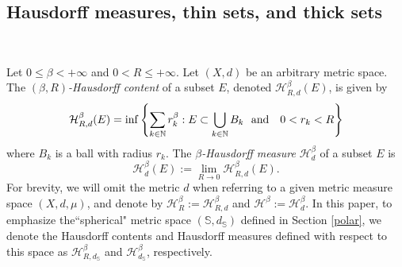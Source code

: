 \documentclass[10pt]{amsart}
\numberwithin{equation}{section}
\begin{document}
  
\subsection{Hausdorff measures, thin sets, and thick sets}
\label{sec-thin}		\ 

Let $0\le \beta<{+\infty}$ and $0<R\leq{+\infty}$. {
Let $(X,d)$ be an arbitrary metric space. The {\it $(\beta,R)$-Hausdorff content}  of a subset $E$, denoted  $\mathcal H^\beta_{R, d}(E)$, is given by
			\begin{equation}
			\notag
			\mathcal H^\beta_{R,d}(E)=\inf\left\{\sum_{k\in\mathbb N} r_k^\beta: E\subset \bigcup_{k\in\mathbb N}B_k\text{\rm \ \ and \ \ } 0<r_k<R \right\}
			\end{equation}
	where $B_k$ is a ball with radius $r_k$. The {\it $\beta$-Hausdorff measure} $\mathcal H_d^\beta$ of a subset $E$ is 
			\[
				\mathcal H_{d}^{\beta}(E):=\lim_{R\to 0}\mathcal H^\beta_{R,d}(E).
			\]
For brevity, we will omit the metric $d$ when referring to  a given metric measure space $(X,d,\mu)$, and  denote by $\mathcal H^\beta_R:=\mathcal H^\beta_{R,d}$ and 	$\mathcal H^{\beta}:=\mathcal H_{d}^{\beta}$. In this paper, {
to emphasize the``spherical" metric space $(\mathbb S, d_{\mathbb S})$ defined in Section \ref{polar}, we denote the Hausdorff contents and Hausdorff measures defined with respect to this space} as $\mathcal H^\beta_{R, d_{\mathbb S}}$ and $\mathcal H^\beta_{d_{\mathbb S}}$, respectively.
 }
 
\end{document}
